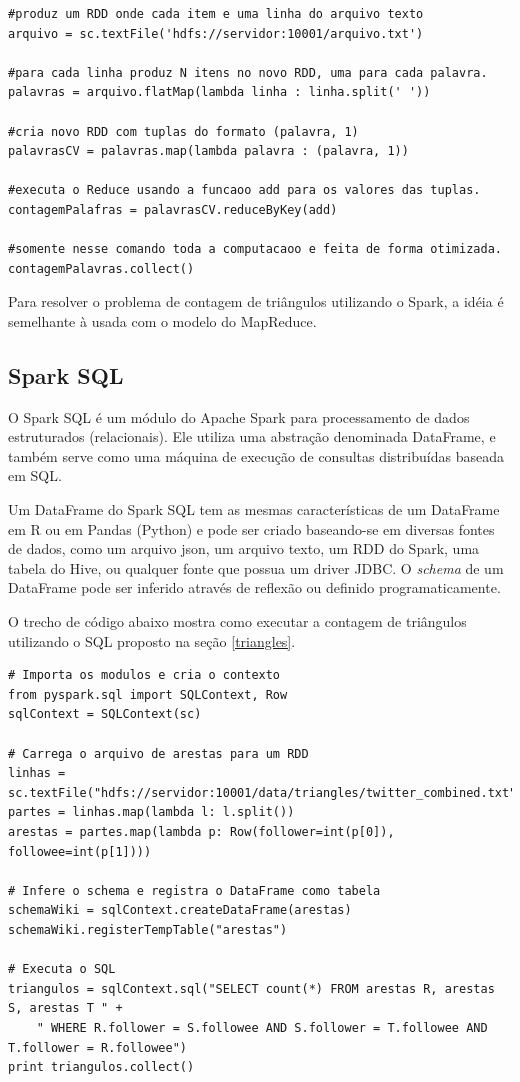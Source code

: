 \begin{lstlisting}[style=MyPythonStyle]
#produz um RDD onde cada item e uma linha do arquivo texto
arquivo = sc.textFile('hdfs://servidor:10001/arquivo.txt') 

#para cada linha produz N itens no novo RDD, uma para cada palavra.
palavras = arquivo.flatMap(lambda linha : linha.split(' ')) 

#cria novo RDD com tuplas do formato (palavra, 1)
palavrasCV = palavras.map(lambda palavra : (palavra, 1)) 

#executa o Reduce usando a funcaoo add para os valores das tuplas.
contagemPalafras = palavrasCV.reduceByKey(add) 

#somente nesse comando toda a computacaoo e feita de forma otimizada.
contagemPalavras.collect() 
\end{lstlisting}

Para resolver o problema de contagem de triângulos utilizando o Spark, a idéia é semelhante à usada com o modelo do MapReduce.

\subsection{Spark SQL}
O Spark SQL é um módulo do Apache Spark para processamento de dados estruturados (relacionais). Ele utiliza uma abstração denominada DataFrame, e também serve como uma máquina de execução de consultas distribuídas baseada em SQL. 

Um DataFrame do Spark SQL tem as mesmas características de um DataFrame em R ou em Pandas (Python) e pode ser criado baseando-se em diversas fontes de dados, como um arquivo json, um arquivo texto, um RDD do Spark, uma tabela do Hive, ou qualquer fonte que possua um driver JDBC. O \textit{schema} de um DataFrame pode ser inferido através de reflexão ou definido programaticamente. 

O trecho de código abaixo mostra como executar a contagem de triângulos utilizando o SQL proposto na seção \ref{triangles}.

\begin{lstlisting}[style=MyPythonStyle]
# Importa os modulos e cria o contexto
from pyspark.sql import SQLContext, Row
sqlContext = SQLContext(sc)

# Carrega o arquivo de arestas para um RDD
linhas = sc.textFile("hdfs://servidor:10001/data/triangles/twitter_combined.txt")
partes = linhas.map(lambda l: l.split())
arestas = partes.map(lambda p: Row(follower=int(p[0]), followee=int(p[1])))

# Infere o schema e registra o DataFrame como tabela
schemaWiki = sqlContext.createDataFrame(arestas)
schemaWiki.registerTempTable("arestas")

# Executa o SQL
triangulos = sqlContext.sql("SELECT count(*) FROM arestas R, arestas S, arestas T " +
    " WHERE R.follower = S.followee AND S.follower = T.followee AND T.follower = R.followee")
print triangulos.collect()
\end{lstlisting}


